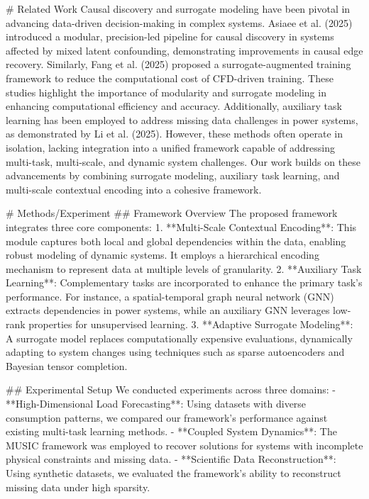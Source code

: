 # Related Work  
Causal discovery and surrogate modeling have been pivotal in advancing data-driven decision-making in complex systems. Asiaee et al. (2025) introduced a modular, precision-led pipeline for causal discovery in systems affected by mixed latent confounding, demonstrating improvements in causal edge recovery. Similarly, Fang et al. (2025) proposed a surrogate-augmented training framework to reduce the computational cost of CFD-driven training. These studies highlight the importance of modularity and surrogate modeling in enhancing computational efficiency and accuracy. Additionally, auxiliary task learning has been employed to address missing data challenges in power systems, as demonstrated by Li et al. (2025). However, these methods often operate in isolation, lacking integration into a unified framework capable of addressing multi-task, multi-scale, and dynamic system challenges. Our work builds on these advancements by combining surrogate modeling, auxiliary task learning, and multi-scale contextual encoding into a cohesive framework.

# Methods/Experiment  
## Framework Overview  
The proposed framework integrates three core components:  
1. **Multi-Scale Contextual Encoding**: This module captures both local and global dependencies within the data, enabling robust modeling of dynamic systems. It employs a hierarchical encoding mechanism to represent data at multiple levels of granularity.  
2. **Auxiliary Task Learning**: Complementary tasks are incorporated to enhance the primary task's performance. For instance, a spatial-temporal graph neural network (GNN) extracts dependencies in power systems, while an auxiliary GNN leverages low-rank properties for unsupervised learning.  
3. **Adaptive Surrogate Modeling**: A surrogate model replaces computationally expensive evaluations, dynamically adapting to system changes using techniques such as sparse autoencoders and Bayesian tensor completion.  

## Experimental Setup  
We conducted experiments across three domains:
- **High-Dimensional Load Forecasting**: Using datasets with diverse consumption patterns, we compared our framework's performance against existing multi-task learning methods.  
- **Coupled System Dynamics**: The MUSIC framework was employed to recover solutions for systems with incomplete physical constraints and missing data.  
- **Scientific Data Reconstruction**: Using synthetic datasets, we evaluated the framework's ability to reconstruct missing data under high sparsity.

